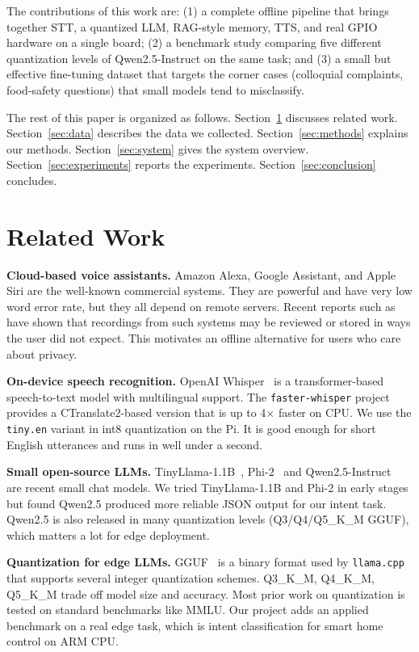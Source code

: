 \documentclass[conference]{IEEEtran}
\begin{document}
The contributions of this work are: (1) a complete offline pipeline that brings together STT, a quantized LLM, RAG-style memory, TTS, and real GPIO hardware on a single board; (2) a benchmark study comparing five different quantization levels of Qwen2.5-Instruct on the same task; and (3) a small but effective fine-tuning dataset that targets the corner cases (colloquial complaints, food-safety questions) that small models tend to misclassify.

The rest of this paper is organized as follows. Section~\ref{sec:related} discusses related work. Section~\ref{sec:data} describes the data we collected. Section~\ref{sec:methods} explains our methods. Section~\ref{sec:system} gives the system overview. Section~\ref{sec:experiments} reports the experiments. Section~\ref{sec:conclusion} concludes.

\section{Related Work}
\label{sec:related}

\textbf{Cloud-based voice assistants.} Amazon Alexa, Google Assistant, and Apple Siri are the well-known commercial systems. They are powerful and have very low word error rate, but they all depend on remote servers. Recent reports such as~\cite{ring2023} have shown that recordings from such systems may be reviewed or stored in ways the user did not expect. This motivates an offline alternative for users who care about privacy.

\textbf{On-device speech recognition.} OpenAI Whisper~\cite{radford2023whisper} is a transformer-based speech-to-text model with multilingual support. The \texttt{faster-whisper} project provides a CTranslate2-based version that is up to 4$\times$ faster on CPU. We use the \texttt{tiny.en} variant in int8 quantization on the Pi. It is good enough for short English utterances and runs in well under a second.

\textbf{Small open-source LLMs.} TinyLlama-1.1B~\cite{zhang2024tinyllama}, Phi-2~\cite{microsoft2023phi2} and Qwen2.5-Instruct~\cite{qwen2025} are recent small chat models. We tried TinyLlama-1.1B and Phi-2 in early stages but found Qwen2.5 produced more reliable JSON output for our intent task. Qwen2.5 is also released in many quantization levels (Q3/Q4/Q5\_K\_M GGUF), which matters a lot for edge deployment.

\textbf{Quantization for edge LLMs.} GGUF~\cite{ggml2024} is a binary format used by \texttt{llama.cpp} that supports several integer quantization schemes. Q3\_K\_M, Q4\_K\_M, Q5\_K\_M trade off model size and accuracy. Most prior work on quantization is tested on standard benchmarks like MMLU. Our project adds an applied benchmark on a real edge task, which is intent classification for smart home control on ARM CPU.
\end{document}
